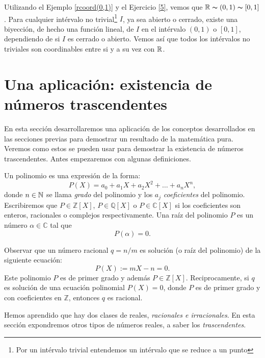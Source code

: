 Utilizando el Ejemplo \vref{rcoord(0,1)} y el Ejercicio \vref{5},
vemos que $\mathbb{R}\thicksim (0,1)\thicksim [0,1]$. Para cualquier
intérvalo no trivial\footnote{Por un intérvalo trivial
entendemos un intérvalo que se reduce a un punto} $I$,  ya sea
abierto o cerrado, existe una biyección, de hecho una función
lineal, de $I$ en el intérvalo $(0,1)$ o $[0,1]$, dependiendo de
si $I$ es cerrado o abierto. Vemos así que todos los
intérvalos no triviales son coordinables entre si y a su vez
con $\mathbb{R}$.



\section{Una aplicación: existencia de números trascendentes}
En esta sección desarrollaremos una aplicación de los conceptos
desarrollados en las secciones previas  para demostrar un resultado de la matemática pura. Veremos como estos se
pueden usar para demostrar la existencia de números
trascendentes. Antes empezaremos con algunas definiciones.

Un polinomio es una expresión de la forma:
\[P(X)=a_0+a_1X+a_2X^2+\dots+a_nX^n,\]
donde $n\in\mathbb{N}$ se llama \emph{grado} del polinomio y los $a_j$
\emph{coeficientes} del polinomio.  Escribiremos que $P\in
\mathbb{Z}[X]$, $P\in\mathbb{Q}[X]$ o $P\in\mathbb{C}[X]$ si los
coeficientes son enteros, racionales o complejos respectivamente.
Una raíz del polinomio $P$ es un número
$\alpha\in\mathbb{C}$ tal que
\[P(\alpha)=0.\]

Observar que un número racional $q=n/m$ es solución (o
raíz del polinomio) de la siguiente ecuación:
\[P(X):=mX-n=0.\]
Este polinomio $P$ es de primer grado y además
$P\in\mathbb{Z}[X]$. Reciprocamente, si $q$ es solución de una
ecuación polinomial $P(X)=0$, donde $P$ es de primer grado y con
coeficientes en $\mathbb{Z}$, entonces $q$ es racional.

Hemos aprendido que hay dos clases de reales, \emph{racionales e
irracionales}. En esta sección expondremos otros tipos de
números reales, a saber los \emph{trascendentes}. 


